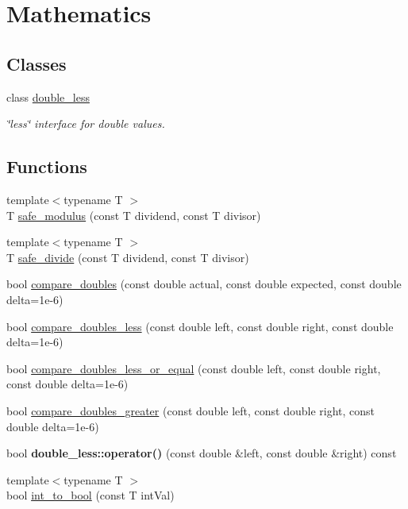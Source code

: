 \hypertarget{group___mathematics}{\section{Mathematics}
\label{group___mathematics}
}
\subsection*{Classes}
\begin{DoxyCompactItemize}
\item 
class \hyperlink{classdouble__less}{double\-\_\-less}
\begin{DoxyCompactList}\small\item\em \char`\"{}less\char`\"{} interface for double values. \end{DoxyCompactList}\end{DoxyCompactItemize}
\subsection*{Functions}
\begin{DoxyCompactItemize}
\item 
{\footnotesize template$<$typename T $>$ }\\T \hyperlink{group___mathematics_ga3bdfe9dcca3b6f83b6b362f30639e68e}{safe\-\_\-modulus} (const T dividend, const T divisor)
\item 
{\footnotesize template$<$typename T $>$ }\\T \hyperlink{group___mathematics_ga59fed2e2713556d98a699dfe8a912124}{safe\-\_\-divide} (const T dividend, const T divisor)
\item 
bool \hyperlink{group___mathematics_ga1f34402f043ad5a6c6d08b0b9575846c}{compare\-\_\-doubles} (const double actual, const double expected, const double delta=1e-\/6)
\item 
bool \hyperlink{group___mathematics_ga8fa00f6eb709cc57ab9861a3d24a4f6b}{compare\-\_\-doubles\-\_\-less} (const double left, const double right, const double delta=1e-\/6)
\item 
bool \hyperlink{group___mathematics_gaf21128bc418cde39e42205d6af8309f3}{compare\-\_\-doubles\-\_\-less\-\_\-or\-\_\-equal} (const double left, const double right, const double delta=1e-\/6)
\item 
bool \hyperlink{group___mathematics_gadca5f00a820552c04da890b07945fadf}{compare\-\_\-doubles\-\_\-greater} (const double left, const double right, const double delta=1e-\/6)
\item 
\hypertarget{group___mathematics_ga8ab290c346a3fa091aac241536ce1c95}{bool {\bfseries double\-\_\-less\-::operator()} (const double \&left, const double \&right) const }\label{group___mathematics_ga8ab290c346a3fa091aac241536ce1c95}

\item 
{\footnotesize template$<$typename T $>$ }\\bool \hyperlink{group___mathematics_gad1be2b3af9940c545752e8e39b2749a3}{int\-\_\-to\-\_\-bool} (const T int\-Val)
\end{DoxyCompactItemize}


